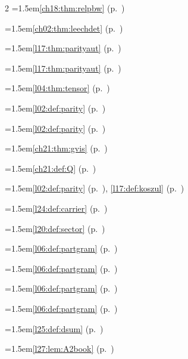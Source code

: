 \begin{multicols}{2}
\hangindent=1.5em\quad \ref{ch18:thm:relpbw} (p.~\pageref{ch18:thm:relpbw})\par
\hangindent=1.5em\quad \ref{ch02:thm:leechdet} (p.~\pageref{ch02:thm:leechdet})\par
\hangindent=1.5em\quad \ref{l17:thm:parityaut} (p.~\pageref{l17:thm:parityaut})\par
\hangindent=1.5em\quad \ref{l17:thm:parityaut} (p.~\pageref{l17:thm:parityaut})\par
\hangindent=1.5em\quad \ref{l04:thm:tensor} (p.~\pageref{l04:thm:tensor})\par
\hangindent=1.5em\quad \ref{l02:def:parity} (p.~\pageref{l02:def:parity})\par
\hangindent=1.5em\quad \ref{l02:def:parity} (p.~\pageref{l02:def:parity})\par
\hangindent=1.5em\quad \ref{ch21:thm:gvis} (p.~\pageref{ch21:thm:gvis})\par
\hangindent=1.5em\quad \ref{ch21:def:Q} (p.~\pageref{ch21:def:Q})\par
\hangindent=1.5em\quad \ref{l02:def:parity} (p.~\pageref{l02:def:parity}), \ref{l17:def:koszul} (p.~\pageref{l17:def:koszul})\par
\hangindent=1.5em\quad \ref{l24:def:carrier} (p.~\pageref{l24:def:carrier})\par
\hangindent=1.5em\quad \ref{l20:def:sector} (p.~\pageref{l20:def:sector})\par
\hangindent=1.5em\quad \ref{l06:def:partgram} (p.~\pageref{l06:def:partgram})\par
\hangindent=1.5em\quad \ref{l06:def:partgram} (p.~\pageref{l06:def:partgram})\par
\hangindent=1.5em\quad \ref{l06:def:partgram} (p.~\pageref{l06:def:partgram})\par
\hangindent=1.5em\quad \ref{l06:def:partgram} (p.~\pageref{l06:def:partgram})\par
\hangindent=1.5em\quad \ref{l25:def:dsum} (p.~\pageref{l25:def:dsum})\par
\hangindent=1.5em\quad \ref{l27:lem:A2book} (p.~\pageref{l27:lem:A2book})\par

\end{multicols}
